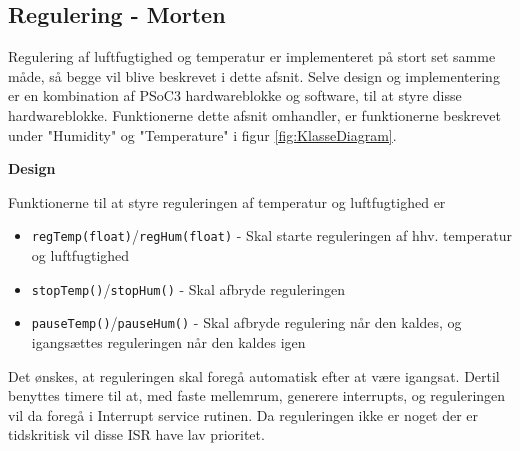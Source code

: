 \subsection{Regulering - Morten}

Regulering af luftfugtighed og temperatur er implementeret på stort set samme måde, så begge vil blive beskrevet i dette afsnit. Selve design og implementering er en kombination af PSoC3 hardwareblokke og software, til at styre disse hardwareblokke. Funktionerne dette afsnit omhandler, er funktionerne beskrevet under "Humidity" og "Temperature" i figur \ref{fig:KlasseDiagram}.

\textbf{Design}

Funktionerne til at styre reguleringen af temperatur og luftfugtighed er 

\begin{itemize}
\item \texttt{regTemp(float)}/\texttt{regHum(float)} - Skal starte reguleringen af hhv. temperatur og luftfugtighed
\item \texttt{stopTemp()}/\texttt{stopHum()} - Skal afbryde reguleringen
\item \texttt{pauseTemp()}/\texttt{pauseHum()} - Skal afbryde regulering når den kaldes, og igangsættes reguleringen når den kaldes igen
\end{itemize}

Det ønskes, at reguleringen skal foregå automatisk efter at være igangsat. Dertil benyttes timere til at, med faste mellemrum, generere interrupts, og reguleringen vil da foregå i Interrupt service rutinen. Da reguleringen ikke er noget der er tidskritisk vil disse ISR have lav prioritet.

